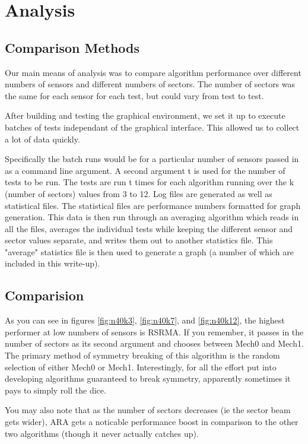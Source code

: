 \section{Analysis}

\subsection{Comparison Methods}

Our main means of analysis was to compare algorithm performance over different numbers of sensors and different numbers of sectors. The number of sectors was the same for each sensor for each test, but could vary from test to test.

After building and testing the graphical environment, we set it up to execute batches of tests independant of the graphical interface. This allowed us to collect a lot of data quickly.

Specifically the batch runs would be for a particular number of sensors passed in as a command line argument. A second argument t is used for the number of tests to be run. The tests are run t times for each algorithm running over the k (number of sectors) values from 3 to 12. Log files are generated as well as statistical files. The statistical files are performance numbers formatted for graph generation. 
This data is then run through an averaging algorithm which reads in all the files, averages the individual tests while keeping the different sensor and sector values separate, and writes them out to another statistics file. This "average" statistics file is then used to generate a graph (a number of which are included in this write-up).

\subsection{Comparision}

As you can see in figures \ref{fig:n40k3}, \ref{fig:n40k7}, and \ref{fig:n40k12}, the highest performer at low numbers of sensors is RSRMA. If you remember, it passes in the number of sectors as its second argument and chooses between Mech0 and Mech1. The primary method of symmetry breaking of this algorithm is the random selection of either Mech0 or Mech1. Interestingly, for all the effort put into developing algorithms guaranteed to break symmetry, apparently sometimes it pays to simply roll the dice. 

You may also note that as the number of sectors decreases (ie the sector beam gets wider), ARA gets a noticable performance boost in comparison to the other two algorithms (though it never actually catches up).

